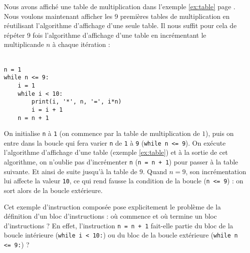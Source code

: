 \begin{ex}\label{ex:tables}
Nous avons affiché une table de multiplication dans l'exemple \ref{ex:table}
page \pageref{ex:table}. Nous voulons maintenant afficher les 9 premières tables de 
multiplication en réutilisant l'algorithme d'affichage d'une seule table. Il nous suffit
pour cela de répéter 9 fois l'algorithme d'affichage d'une table en incrémentant 
le multiplicande $n$ à chaque itération :\\
\mbox{}\ \ \begin{py}{5cm}
\begin{verbatim}
n = 1
while n <= 9:
    i = 1
    while i < 10:
        print(i, '*', n, '=', i*n)
        i = i + 1
    n = n + 1
\end{verbatim}
\end{py}
\hfill
\begin{minipage}[t]{9.5cm}\footnotesize
On initialise {\tt n} à {\tt 1} (on commence par la table de multiplication de $1$),
puis on entre dans la boucle qui fera varier {\tt n} de {\tt 1} à {\tt 9} ({\tt while n <= 9}).
On exécute l'algorithme d'affichage d'une table (exemple \ref{ex:table}) et à la sortie de
cet algorithme, on n'oublie pas d'incrémenter {\tt n} ({\tt n = n + 1}) pour passer à la
table suivante. Et ainsi de suite jusqu'à la table de $9$. Quand $n = 9$, son incrémentation
lui affecte la valeur {\tt 10}, ce qui rend fausse la condition de la boucle ({\tt n <= 9}) :
on sort alors de la boucle extérieure. 
\end{minipage}
\end{ex}

\noindent Cet exemple d'instruction composée pose explicitement le problème de la définition
d'un bloc d'instructions : où commence et où termine un bloc d'instructions ?
En effet, l'instruction {\tt n = n + 1} fait-elle partie du bloc de la boucle intérieure
({\tt while i < 10:}) ou du bloc de la boucle extérieure ({\tt while n <= 9:}) ?

